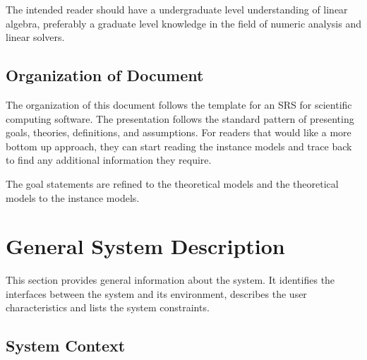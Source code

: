 \documentclass[12pt]{article}
\begin{document}

The intended reader should have a undergraduate level understanding of linear
algebra, preferably a graduate level knowledge in the field of numeric analysis
and linear solvers.

\subsection{Organization of Document}

The organization of this document follows the template for an SRS for scientific
computing software. The presentation follows the standard pattern of presenting
goals, theories, definitions, and assumptions. For readers that would like a
more bottom up approach, they can start reading the instance models and trace
back to find any additional information they require.

The goal statements are refined to the theoretical models and the theoretical
models to the instance models.



\section{General System Description}

This section provides general information about the system.  It identifies the
interfaces between the system and its environment, describes the user
characteristics and lists the system constraints.


\subsection{System Context}
\end{document}
